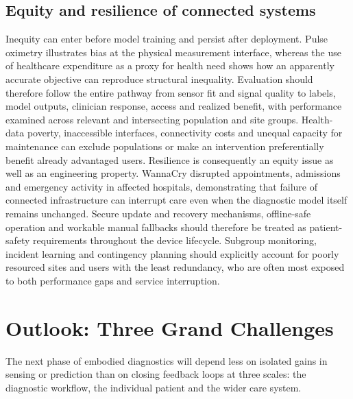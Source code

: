 \documentclass[12pt,a4paper]{article}
\begin{document}
\subsection{Equity and resilience of connected systems}
\label{subsec:equity_resilience}
Inequity can enter before model training and persist after deployment. Pulse oximetry illustrates bias at the physical measurement interface, whereas the use of healthcare expenditure as a proxy for health need shows how an apparently accurate objective can reproduce structural inequality. Evaluation should therefore follow the entire pathway from sensor fit and signal quality to labels, model outputs, clinician response, access and realized benefit, with performance examined across relevant and intersecting population and site groups. Health-data poverty, inaccessible interfaces, connectivity costs and unequal capacity for maintenance can exclude populations or make an intervention preferentially benefit already advantaged users. Resilience is consequently an equity issue as well as an engineering property. WannaCry disrupted appointments, admissions and emergency activity in affected hospitals, demonstrating that failure of connected infrastructure can interrupt care even when the diagnostic model itself remains unchanged. Secure update and recovery mechanisms, offline-safe operation and workable manual fallbacks should therefore be treated as patient-safety requirements throughout the device lifecycle. Subgroup monitoring, incident learning and contingency planning should explicitly account for poorly resourced sites and users with the least redundancy, who are often most exposed to both performance gaps and service interruption.


\section{Outlook: Three Grand Challenges}
\label{sec:future_outlook}
The next phase of embodied diagnostics will depend less on isolated gains in sensing or prediction than on closing feedback loops at three scales: the diagnostic workflow, the individual patient and the wider care system.
\end{document}

